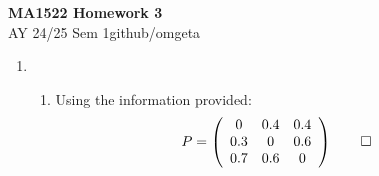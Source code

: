 \documentclass[12pt, a4paper]{article}
\newcommand{\mytitle}{MA1522 Homework 3}
\newcommand{\myauthor}{github/omgeta}
\newcommand{\mydate}{AY 24/25 Sem 1}
\begin{document}
\raggedright
\footnotesize
\begin{center}
{\normalsize{\textbf{\mytitle}}} \\
{\footnotesize{\mydate\hspace{2pt}\textemdash\hspace{2pt}\myauthor}}
\end{center}

\begin{enumerate}[Q\arabic*.]
  \item 
    \begin{enumerate}[(\alph*)]
      \item Using the information provided:
        \begin{align*}
          P &= \left(\begin{array}{ccc} 0 & 0.4 & 0.4\\ 0.3 & 0 & 0.6\\ 0.7 & 0.6 & 0 \end{array}\right) \qed
        \end{align*}


\end{enumerate}
\end{enumerate}
\end{document}
